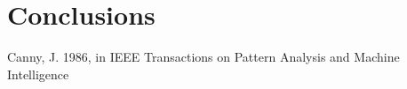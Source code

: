 \documentclass{aa}
\begin{document}
\section{Conclusions}



%
%

\begin{thebibliography}{}

 Canny, J. 1986,
      in IEEE Transactions on Pattern Analysis and Machine Intelligence

\end{thebibliography}
\end{document}
